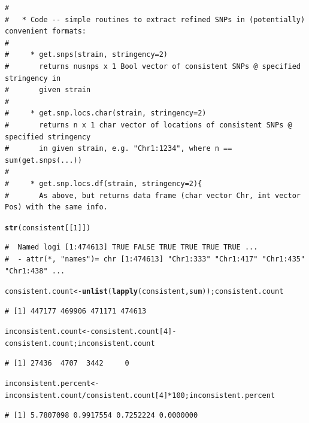 \documentclass{article}\usepackage[]{graphicx}\usepackage[]{color}
\makeatletter
\newcommand{\hlnum}[1]{\textcolor[rgb]{0.686,0.059,0.569}{#1}}%
\newcommand{\hlopt}[1]{\textcolor[rgb]{0,0,0}{#1}}%
\newcommand{\hlstd}[1]{\textcolor[rgb]{0.345,0.345,0.345}{#1}}%
\newcommand{\hlkwb}[1]{\textcolor[rgb]{0.69,0.353,0.396}{#1}}%
\newcommand{\hlkwd}[1]{\textcolor[rgb]{0.737,0.353,0.396}{\textbf{#1}}}%
\newenvironment{kframe}{%
 \def\at@end@of@kframe{}%
 \ifinner\ifhmode%
  \def\at@end@of@kframe{\end{minipage}}%
  \begin{minipage}{\columnwidth}%
 \fi\fi%
 \def\FrameCommand##1{\hskip\@totalleftmargin \hskip-\fboxsep
 \colorbox{shadecolor}{##1}\hskip-\fboxsep
     \hskip-\linewidth \hskip-\@totalleftmargin \hskip\columnwidth}%
 \MakeFramed {\advance\hsize-\width
   \@totalleftmargin\z@ \linewidth\hsize
   \@setminipage}}%
 {\par\unskip\endMakeFramed%
 \at@end@of@kframe}
\newenvironment{knitrout}{}{} %
\makeatother
\begin{document}
\begin{knitrout}
\begin{kframe}
\begin{verbatim}
# 
#   * Code -- simple routines to extract refined SNPs in (potentially) convenient formats:
# 
#     * get.snps(strain, stringency=2)
#       returns nusnps x 1 Bool vector of consistent SNPs @ specified stringency in
#       given strain
# 
#     * get.snp.locs.char(strain, stringency=2)
#       returns n x 1 char vector of locations of consistent SNPs @ specified stringency
#       in given strain, e.g. "Chr1:1234", where n == sum(get.snps(...))
# 
#     * get.snp.locs.df(strain, stringency=2){
#       As above, but returns data frame (char vector Chr, int vector Pos) with the same info.
\end{verbatim}
\end{kframe}
\end{knitrout}
\begin{knitrout}\tiny
{}\color{fgcolor}\begin{kframe}
\begin{alltt}
\hlkwd{str}\hlstd{(consistent[[}\hlnum{1}\hlstd{]])}
\end{alltt}
\begin{verbatim}
#  Named logi [1:474613] TRUE FALSE TRUE TRUE TRUE TRUE ...
#  - attr(*, "names")= chr [1:474613] "Chr1:333" "Chr1:417" "Chr1:435" "Chr1:438" ...
\end{verbatim}
\end{kframe}
\end{knitrout}
\begin{knitrout}\footnotesize
{}\color{fgcolor}\begin{kframe}
\begin{alltt}
\hlstd{consistent.count} \hlkwb{<-} \hlkwd{unlist}\hlstd{(}\hlkwd{lapply}\hlstd{(consistent, sum)) ; consistent.count}
\end{alltt}
\begin{verbatim}
# [1] 447177 469906 471171 474613
\end{verbatim}
\begin{alltt}
\hlstd{inconsistent.count} \hlkwb{<-} \hlstd{consistent.count[}\hlnum{4}\hlstd{]} \hlopt{-} \hlstd{consistent.count; inconsistent.count}
\end{alltt}
\begin{verbatim}
# [1] 27436  4707  3442     0
\end{verbatim}
\begin{alltt}
\hlstd{inconsistent.percent} \hlkwb{<-} \hlstd{inconsistent.count}\hlopt{/}\hlstd{consistent.count[}\hlnum{4}\hlstd{]}\hlopt{*}\hlnum{100}\hlstd{; inconsistent.percent}
\end{alltt}
\begin{verbatim}
# [1] 5.7807098 0.9917554 0.7252224 0.0000000
\end{verbatim}
\end{kframe}
\end{knitrout}
\end{document}
